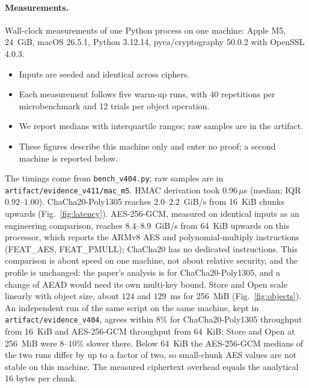 \documentclass[pdflatex,sn-mathphys-num]{sn-jnl}
\newcommand{\code}[1]{\texttt{#1}}
\newcommand{\fpath}[1]{\nolinkurl{#1}}%
\theoremstyle{plain}
\begin{document}
\paragraph{Measurements.}
Wall-clock measurements of one Python process on one machine: Apple M5, 24~GiB, macOS 26.5.1, Python 3.12.14, pyca/cryptography 50.0.2 with OpenSSL 4.0.3.
\begin{itemize}
\item Inputs are seeded and identical across ciphers.
\item Each measurement follows five warm-up runs, with 40 repetitions per microbenchmark and 12 trials per object operation.
\item We report medians with interquartile ranges; raw samples are in the artifact.
\item These figures describe this machine only and enter no proof; a second machine is reported below.
\end{itemize}
The timings come from \fpath{bench_v404.py}; raw samples are in \fpath{artifact/evidence_v411/mac_m5}. HMAC derivation took $0.96\,\mu$s (median; IQR $0.92$--$1.00$). ChaCha20-Poly1305 reaches $2.0$--$2.2$~GiB/s from 16~KiB chunks upwards (Fig.~\ref{fig:latency}). AES-256-GCM, measured on identical inputs as an engineering comparison, reaches $8.4$--$8.9$~GiB/s from 64~KiB upwards on this processor, which reports the ARMv8 AES and polynomial-multiply instructions (FEAT\_AES, FEAT\_PMULL); ChaCha20 has no dedicated instructions. This comparison is about speed on one machine, not about relative security, and the profile is unchanged: the paper's analysis is for ChaCha20-Poly1305, and a change of AEAD would need its own multi-key bound. Store and Open scale linearly with object size, about $124$ and $129$~ms for 256~MiB (Fig.~\ref{fig:objects}). An independent run of the same script on the same machine, kept in \code{artifact/evidence\_v404}, agrees within $8\%$ for ChaCha20-Poly1305 throughput from 16~KiB and AES-256-GCM throughput from 64~KiB; Store and Open at 256~MiB were $8$--$10\%$ slower there. Below 64~KiB the AES-256-GCM medians of the two runs differ by up to a factor of two, so small-chunk AES values are not stable on this machine. The measured ciphertext overhead equals the analytical 16 bytes per chunk.
\end{document}
